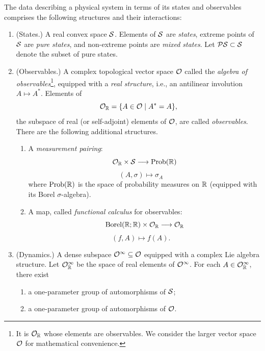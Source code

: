 \begin{definition} \label{ax:DOSO}
The data describing a physical system in terms of its states and observables comprises the following structures and their interactions:

\begin{enumerate}
\item (States.) A real convex space $\mathcal{S}$. Elements of $\mathcal{S}$ are \emph{states}, extreme points of $\mathcal{S}$ are \emph{pure states}, and non-extreme points are \emph{mixed states}. Let $\mathcal{PS} \subset \mathcal{S}$ denote the subset of pure states.

\item (Observables.) A complex topological vector space $\mathcal{O}$ called the \emph{algebra of observables}\footnote{It is $\mathcal{O}_{\mathbb{R}}$ whose elements are observables. We consider the larger vector space $\mathcal{O}$ for mathematical convenience.}, equipped with a \emph{real structure}, i.e., an antilinear involution $A\mapsto A^{*}$. Elements of
\[\mathcal{O}_{\mathbb{R}} = \{A \in \mathcal{O} \mid A^* = A\},\]
the subspace of real (or self-adjoint) elements of $\mathcal{O}$, are called \emph{observables}. There are the following additional structures.
\begin{enumerate}
    \item A \emph{measurement pairing}:
\[ \mathcal{O}_{\mathbb{R}}\times\mathcal{S}\longrightarrow \text{Prob}(\mathbb{R}) \]
\[ (A, \sigma)\mapsto\sigma_{A} \quad \]
where $\text{Prob}(\mathbb{R})$ is the space of probability measures on $\mathbb{R}$ (equipped with its Borel $\sigma$-algebra).

    \item A map, called \emph{functional calculus} for observables:
\[ \text{Borel}(\mathbb{R};\mathbb{R})\times\mathcal{O}_{\mathbb{R}}\longrightarrow\mathcal{O}_{\mathbb{R}} \]
\[ (f,A)\mapsto f(A). \quad \]
\end{enumerate}

\item (Dynamics.) A dense subspace $\mathcal{O}^{\infty} \subseteq \mathcal{O}$ equipped with a complex Lie algebra structure. Let $\mathcal{O}_{\mathbb{R}}^{\infty}$ be the space of real elements of $\mathcal{O}^\infty$. For each $A \in \mathcal{O}_{\mathbb{R}}^{\infty}$, there exist
\begin{enumerate}
    \item a one-parameter group of automorphisms of $\mathcal{S}$;
    \item a one-parameter group of automorphisms of $\mathcal{O}$.
\end{enumerate}
\end{enumerate}
\end{definition}

